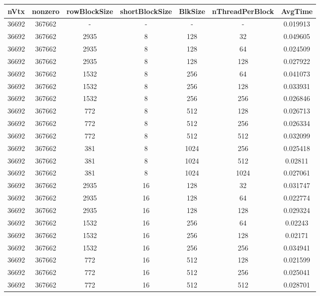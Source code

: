 \documentclass[9pt]{article}
\begin{document}
\SetBgPosition{0.25cm,-5.0cm}
\begin{tabular}{|c|c|c|c|c|c|c| }  
\hline
nVtx  & nonzero  & rowBlockSize  & shortBlockSize  & BlkSize  & nThreadPerBlock  & AvgTime \\
\hline
36692  & 367662  &  -  & -  & -  & -  &0.019913 \\
\hline
36692  & 367662  & 2935  & 8  & 128  & 32  & 0.049605 \\
\hline
36692  & 367662  & 2935  & 8  & 128  & 64  & 0.024509 \\
\hline
36692  & 367662  & 2935  & 8  & 128  & 128  & 0.027922 \\
\hline
36692  & 367662  & 1532  & 8  & 256  & 64  & 0.041073 \\
\hline
36692  & 367662  & 1532  & 8  & 256  & 128  & 0.033931 \\
\hline
36692  & 367662  & 1532  & 8  & 256  & 256  & 0.026846 \\
\hline
36692  & 367662  & 772  & 8  & 512  & 128  & 0.026713 \\
\hline
36692  & 367662  & 772  & 8  & 512  & 256  & 0.026334 \\
\hline
36692  & 367662  & 772  & 8  & 512  & 512  & 0.032099 \\
\hline
36692  & 367662  & 381  & 8  & 1024  & 256  & 0.025418 \\
\hline
36692  & 367662  & 381  & 8  & 1024  & 512  & 0.02811 \\
\hline
36692  & 367662  & 381  & 8  & 1024  & 1024  & 0.027061 \\
\hline
36692  & 367662  & 2935  & 16  & 128  & 32  & 0.031747 \\
\hline
36692  & 367662  & 2935  & 16  & 128  & 64  & 0.022774 \\
\hline
36692  & 367662  & 2935  & 16  & 128  & 128  & 0.029324 \\
\hline
36692  & 367662  & 1532  & 16  & 256  & 64  & 0.02243 \\
\hline
36692  & 367662  & 1532  & 16  & 256  & 128  & 0.02171 \\
\hline
36692  & 367662  & 1532  & 16  & 256  & 256  & 0.034941 \\
\hline
36692  & 367662  & 772  & 16  & 512  & 128  & 0.021599 \\
\hline
36692  & 367662  & 772  & 16  & 512  & 256  & 0.025041 \\
\hline
36692  & 367662  & 772  & 16  & 512  & 512  & 0.028701 \\

\end{tabular}
\end{document}
